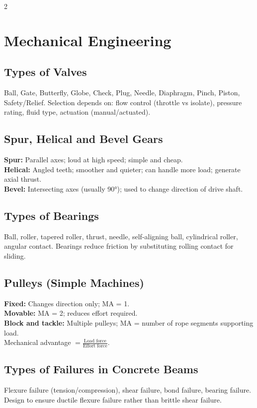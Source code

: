 \documentclass[10pt,a4paper]{article}
\begin{document}
\begin{multicols}{2}
\section{Mechanical Engineering}

\subsection{Types of Valves}
Ball, Gate, Butterfly, Globe, Check, Plug, Needle, Diaphragm, Pinch, Piston, Safety/Relief. Selection depends on: flow control (throttle vs isolate), pressure rating, fluid type, actuation (manual/actuated).

\subsection{Spur, Helical and Bevel Gears}
\textbf{Spur:} Parallel axes; loud at high speed; simple and cheap.\\
\textbf{Helical:} Angled teeth; smoother and quieter; can handle more load; generate axial thrust.\\
\textbf{Bevel:} Intersecting axes (usually 90°); used to change direction of drive shaft.

\subsection{Types of Bearings}
Ball, roller, tapered roller, thrust, needle, self-aligning ball, cylindrical roller, angular contact. Bearings reduce friction by substituting rolling contact for sliding.

\subsection{Pulleys (Simple Machines)}
\textbf{Fixed:} Changes direction only; MA = 1.\\
\textbf{Movable:} MA = 2; reduces effort required.\\
\textbf{Block and tackle:} Multiple pulleys; MA = number of rope segments supporting load.\\
Mechanical advantage $= \frac{\text{Load force}}{\text{Effort force}}$.

\subsection{Types of Failures in Concrete Beams}
Flexure failure (tension/compression), shear failure, bond failure, bearing failure. Design to ensure ductile flexure failure rather than brittle shear failure.


\end{multicols}
\end{document}
